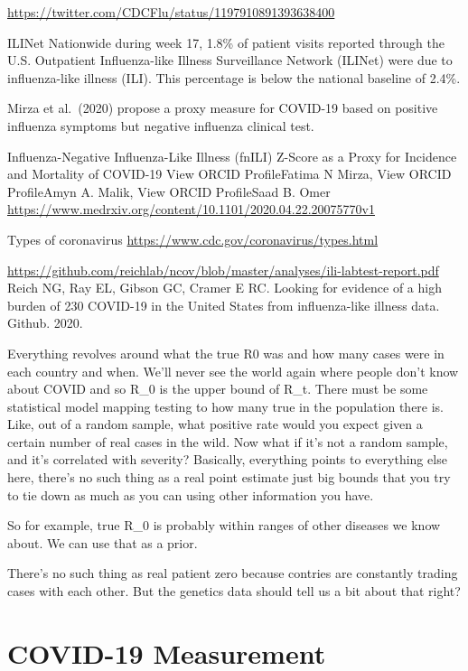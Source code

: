 \documentclass[
]{book}
\begin{document}
\url{https://twitter.com/CDCFlu/status/1197910891393638400}

ILINet
Nationwide during week 17, 1.8\% of patient visits reported through the U.S. Outpatient Influenza-like Illness Surveillance Network (ILINet) were due to influenza-like illness (ILI). This percentage is below the national baseline of 2.4\%.

Mirza et al.~(2020) propose a proxy measure for COVID-19 based on positive influenza symptoms but negative influenza clinical test.

Influenza-Negative Influenza-Like Illness (fnILI) Z-Score as a Proxy for Incidence and Mortality of COVID-19
View ORCID ProfileFatima N Mirza, View ORCID ProfileAmyn A. Malik, View ORCID ProfileSaad B. Omer
\url{https://www.medrxiv.org/content/10.1101/2020.04.22.20075770v1}

Types of coronavirus
\url{https://www.cdc.gov/coronavirus/types.html}

\url{https://github.com/reichlab/ncov/blob/master/analyses/ili-labtest-report.pdf}
Reich NG, Ray EL, Gibson GC, Cramer E RC. Looking for evidence of a high burden of
230 COVID-19 in the United States from influenza-like illness data. Github. 2020.

Everything revolves around what the true R0 was and how many cases were in each country and when. We'll never see the world again where people don't know about COVID and so R\_0 is the upper bound of R\_t. There must be some statistical model mapping testing to how many true in the population there is. Like, out of a random sample, what positive rate would you expect given a certain number of real cases in the wild. Now what if it's not a random sample, and it's correlated with severity? Basically, everything points to everything else here, there's no such thing as a real point estimate just big bounds that you try to tie down as much as you can using other information you have.

So for example, true R\_0 is probably within ranges of other diseases we know about. We can use that as a prior.

There's no such thing as real patient zero because contries are constantly trading cases with each other. But the genetics data should tell us a bit about that right?

\hypertarget{covid-19-measurement}{%
\chapter{COVID-19 Measurement}\label{covid-19-measurement}}
\end{document}
